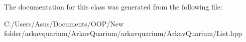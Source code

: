 The documentation for this class was generated from the following file\+:\begin{DoxyCompactItemize}
\item 
C\+:/\+Users/\+Asus/\+Documents/\+O\+O\+P/\+New folder/arkavquarium/\+Arkav\+Quarium/arkavquarium/\+Arkav\+Quarium/List.\+hpp\end{DoxyCompactItemize}
